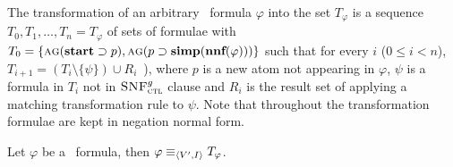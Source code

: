 \documentclass[letterpaper]{article} %
\begin{document}
The transformation of an arbitrary \CTL\ formula $\varphi$ into the set $T_{\varphi}$ is a sequence $T_0, T_1,\dots, T_n=T_{\varphi}$ of sets of formulae with $T_0=\{\textsc{a} \textsc{g}(\textbf{start} \supset p), \textsc{a} \textsc{g}(p \supset \textbf{simp}(\textbf{nnf}(\varphi)))\}$ such that for every $i$ ($0 \leq i< n$), $T_{i+1} = (T_i \setminus \{\psi\}) \cup R_i$~\cite{zhang2009refined}), where $p$ is a new atom not appearing in $\varphi$, $\psi$ is a formula in $T_i$ not in ${\textsc{SNF}_{\textsc{ctl}}^g}$ clause and $R_i$ is the result set of applying a matching transformation rule to $\psi$. Note that throughout the transformation formulae are kept in negation normal form.

\begin{proposition}\label{pro:TranE}
 Let $\varphi$ be a \CTL\ formula, then $\varphi \equiv_{{\langle{V', I}\rangle}} T_{\varphi}$.
\end{proposition}
\end{document}
